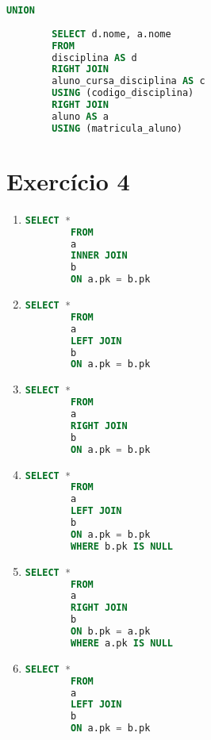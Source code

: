 \documentclass{article}
\begin{document}
\begin{enumerate}[label=\alph*)]
\begin{lstlisting}[language=SQL]
        UNION
        
        SELECT d.nome, a.nome
        FROM
        disciplina AS d
        RIGHT JOIN
        aluno_cursa_disciplina AS c
        USING (codigo_disciplina)
        RIGHT JOIN
        aluno AS a
        USING (matricula_aluno)
    \end{lstlisting}


\end{enumerate}

\section*{Exercício 4}

\begin{enumerate}[label=\alph*)]

    \item 
    \begin{lstlisting}[language=SQL]
        SELECT *
        FROM 
        a
        INNER JOIN
        b
        ON a.pk = b.pk       
    \end{lstlisting}

    \item 
    \begin{lstlisting}[language=SQL]
        SELECT *
        FROM
        a
        LEFT JOIN
        b
        ON a.pk = b.pk
    \end{lstlisting}

    \item 
    \begin{lstlisting}[language=SQL]
        SELECT *
        FROM
        a
        RIGHT JOIN
        b
        ON a.pk = b.pk
    \end{lstlisting}

    \item 
    \begin{lstlisting}[language=SQL]
        SELECT *
        FROM
        a
        LEFT JOIN
        b
        ON a.pk = b.pk
        WHERE b.pk IS NULL
    \end{lstlisting}

    \item 
    \begin{lstlisting}[language=SQL]
        SELECT *
        FROM
        a
        RIGHT JOIN
        b
        ON b.pk = a.pk
        WHERE a.pk IS NULL
    \end{lstlisting}

    \item 
    \begin{lstlisting}[language=SQL]
        SELECT *
        FROM
        a
        LEFT JOIN
        b
        ON a.pk = b.pk
        

\end{lstlisting}
\end{enumerate}
\end{document}
